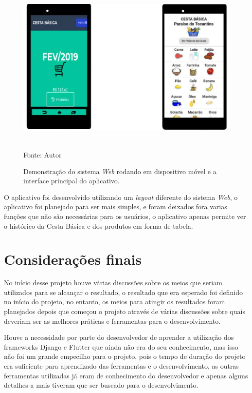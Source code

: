 \documentclass{ifto-tex}
\begin{document}
\begin{figure}[!h]
	\begin{center}
		\includegraphics[width=12.0cm, height= 8.0cm]{movel.png}    %
		
		Fonte: Autor
		\caption{Demonstração do sistema \textit{Web} rodando em dispositivo móvel e a interface principal do aplicativo.} 
		\label{fig:faces}
	\end{center}
\end{figure}

O aplicativo foi desenvolvido utilizando um \textit{layout} diferente do sistema \textit{Web}, o aplicativo foi planejado para ser mais simples, e foram deixados fora varias funções que não são necessárias para os usuários, o aplicativo apenas permite ver o histórico da Cesta Básica e dos produtos em forma de tabela.

\chapter{Considerações finais}
No início desse projeto houve várias discussões sobre os meios que seriam utilizados para se alcançar o
resultado, o resultado que era esperado foi definido no início do projeto, no entanto, os meios para atingir os
resultados foram planejados depois que começou o projeto através de várias discussões sobre quais deveriam ser as
melhores práticas e ferramentas para o desenvolvimento.

Houve a necessidade por parte do desenvolvedor de aprender a utilização dos frameworks Django e Flutter que ainda
não era do seu conhecimento, mas isso não foi um grande empecilho para o projeto, pois o tempo de duração do
projeto era suficiente para aprendizado das ferramentas e o desenvolvimento, as outras ferramentas utilizadas já eram
de conhecimento do desenvolvedor e apenas alguns detalhes a mais tiveram que ser buscado para o
desenvolvimento.
\end{document}
